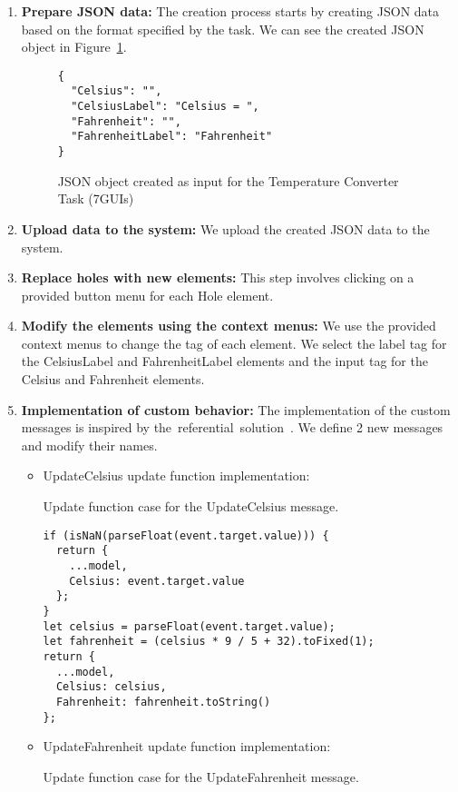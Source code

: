 \begin{enumerate}
	\item \textbf{Prepare JSON data:} The creation process starts by creating JSON data based on the format specified by the task.
	      We can see the created JSON object in Figure~\ref{fig:temp-json}.
	      \begin{figure}[H]
		      \caption{JSON object created as input for the Temperature Converter Task (7GUIs)}
		      \centering
		      \label{fig:temp-json}
		      \begin{lstlisting}
{
  "Celsius": "",
  "CelsiusLabel": "Celsius = ",
  "Fahrenheit": "",
  "FahrenheitLabel": "Fahrenheit"
}
    \end{lstlisting}
	      \end{figure}
	\item \textbf{Upload data to the system:} We upload the created JSON data to the system.
	\item \textbf{Replace holes with new elements:} This step involves clicking on a provided button menu for each Hole element.
	\item \textbf{Modify the elements using the context menus:} We use the provided context menus to change the tag of each element.
	      We select the label tag for the CelsiusLabel and FahrenheitLabel elements and the input tag for the Celsius and Fahrenheit elements.
	\item \textbf{Implementation of custom behavior:} The implementation of the custom messages is inspired by the~referential~solution~\cite{7guis-React-TypeScript-MobX/src/app/guis/tempconv.tsx}. We define 2 new messages and modify their names.
	      \begin{itemize}
		      \item UpdateCelsius update function implementation:
		            \begin{listing}[htbp]
			            \caption{Update function case for the UpdateCelsius message.}
			            \begin{lstlisting}
if (isNaN(parseFloat(event.target.value))) {
  return {
    ...model,
    Celsius: event.target.value
  };
}
let celsius = parseFloat(event.target.value);
let fahrenheit = (celsius * 9 / 5 + 32).toFixed(1);
return {
  ...model,
  Celsius: celsius,
  Fahrenheit: fahrenheit.toString()
};            \end{lstlisting}
		            \end{listing}

		      \item UpdateFahrenheit update function implementation:
		            \begin{listing}[htbp]
			            \caption{Update function case for the UpdateFahrenheit message.}


\end{listing}
\end{itemize}
\end{enumerate}
